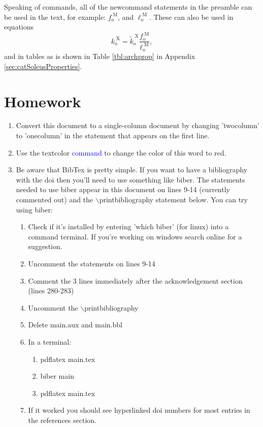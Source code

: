 \documentclass[11pt,twocolumn,a4paper]{article}
\newcommand{\fiso}{f_{\mathrm{o}}^{\;\!\mathrm{M}}}
\newcommand{\kxiso}{k_{\mathrm{o}}^{\;\!\mathrm{X}}}
\newcommand{\kxisoNorm}{\tilde{k}_{\mathrm{o}}^{\;\!\mathrm{X}}}
\newcommand{\lopt}{\ell_{\mathrm{o}}^{\;\!\mathrm{M}}}
\begin{document}
Speaking of commands, all of the newcommand statements in the preamble can be used in the text, for example: $\fiso$, and $\lopt$. These can also be used in equations
\begin{equation}
\kxiso = \kxisoNorm \dfrac{\fiso}{\lopt},  \label{eqn:xbridgeStiffness}
\end{equation}
and in tables as is shown in Table \ref{tbl:archprop} in Appendix \ref{sec:catSoleusProperties}.


\section{Homework}

\begin{enumerate}
\item Convert this document to a single-column document by changing 'twocolumn' to 'onecolumn' in the statement that appears on the first line.
\item  Use the textcolor \textcolor{blue}{command} to change the color of this word to red.
\item Be aware that BibTex is pretty simple. If you want to have a bibliography with the doi then you'll need to use something like biber. The statements needed to use biber appear in this document on lines 9-14 (currently commented out) and the $\backslash$printbibliography statement below. You can try using biber:
\begin{enumerate}
    \item Check if it's installed by entering 'which biber' (for linux) into a command terminal. If you're working on windows search online for a suggestion.
    \item Uncomment the statements on lines 9-14
    \item Comment the 3 lines immediately after the acknowledgement section (lines 280-283)
    \item Uncomment the $\backslash$printbibliography
    \item Delete main.aux and main.bbl
    \item In a terminal:
    \begin{enumerate}
        \item pdflatex main.tex
        \item biber main
        \item pdflatex main.tex
    \end{enumerate}
    \item If it worked you should see hyperlinked doi numbers for most entries in the references section.
\end{enumerate}

\end{enumerate}
\end{document}
